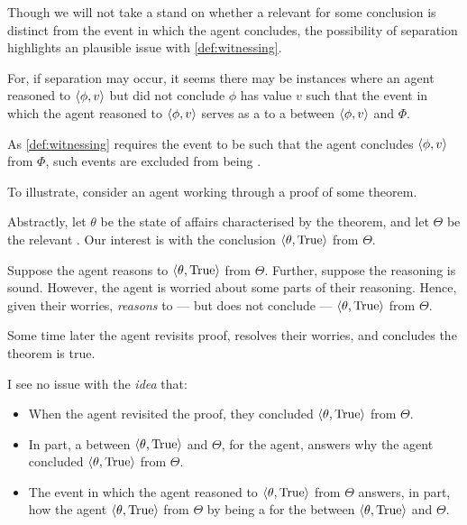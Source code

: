 \begin{note}
  Though we will not take a stand on whether a relevant  for some conclusion is distinct from the event in which the agent concludes, the possibility of separation highlights an plausible issue with \autoref{def:witnessing}.

  For, if separation may occur, it seems there may be instances where an agent reasoned to \(\langle \phi, v \rangle\) but did not conclude \(\phi\) has value \(v\) such that the event in which the agent reasoned to \(\langle \phi, v \rangle\) serves as a  to a \ros{} between \(\langle \phi, v \rangle\) and \(\Phi\).

  As \autoref{def:witnessing} requires the event to be such that the agent concludes \(\langle \phi, v \rangle\) from \(\Phi\), such events are excluded from being .

  To illustrate, consider an agent working through a proof of some theorem.

  Abstractly, let \(\theta\) be the state of affairs characterised by the theorem, and let \(\Theta\) be the relevant \pool{}.
  Our interest is with the conclusion \(\langle \theta, \text{True} \rangle\) from \(\Theta\).

  Suppose the agent reasons to \(\langle \theta, \text{True} \rangle\) from \(\Theta\).
  Further, suppose the \agents{} reasoning is sound.
  However, the agent is worried about some parts of their reasoning.
  Hence, given their worries, \emph{reasons} to --- but does not conclude --- \(\langle \theta, \text{True} \rangle\) from \(\Theta\).

  Some time later the agent revisits proof, resolves their worries, and concludes the theorem is true.

  I see no issue with the \emph{idea} that:
  \begin{itemize}[noitemsep]
  \item
    When the agent revisited the proof, they concluded \(\langle \theta, \text{True} \rangle\) from \(\Theta\).
  \item
    In part, a \ros{} between \(\langle \theta, \text{True} \rangle\) and \(\Theta\), for the agent, answers why the agent concluded \(\langle \theta, \text{True} \rangle\) from \(\Theta\).
  \item
    The event in which the agent reasoned to \(\langle \theta, \text{True} \rangle\) from \(\Theta\) answers, in part, how the agent \(\langle \theta, \text{True} \rangle\) from \(\Theta\) by being a \wit{} for the \ros{} between \(\langle \theta, \text{True} \rangle\) and \(\Theta\).
  \end{itemize}


\end{note}
